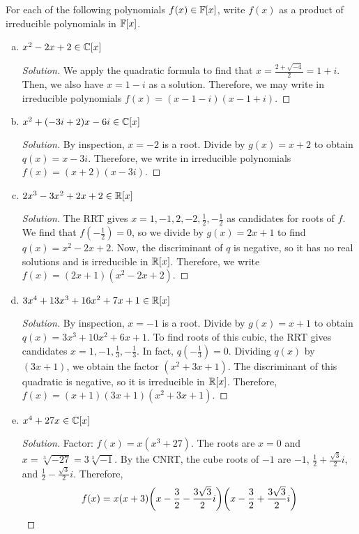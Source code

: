 \documentclass{agony}
\begin{document}
\question For each of the following polynomials $f(x) \in \mathbb{F}[x]$,
write $f(x)$ as a product of irreducible polynomials in $\mathbb{F}[x]$.
\begin{enumerate}[(a)]
  \item $x^2 - 2x + 2 \in \mathbb{C}[x]$
        \begin{proof}[Solution]
          We apply the quadratic formula to find that $x = \frac{2+\sqrt{-4}}{2} = 1+i$.
          Then, we also have $x = 1-i$ as a solution.
          Therefore, we may write in irreducible polynomials $f(x)=(x-1-i)(x-1+i)$.
        \end{proof}
  \item $x^2 + (-3i + 2)x - 6i \in \mathbb{C}[x]$
        \begin{proof}[Solution]
          By inspection, $x=-2$ is a root.
          Divide by $g(x)=x+2$ to obtain $q(x)=x-3i$.
          Therefore, we write in irreducible polynomials $f(x)=(x+2)(x-3i)$.
        \end{proof}
  \item $2x^3 - 3x^2 + 2x + 2 \in \mathbb{R}[x]$
        \begin{proof}[Solution]
          The RRT gives $x=1,-1,2,-2,\frac12,-\frac12$ as candidates for roots of $f$.
          We find that $f(-\frac12)=0$, so we divide by $g(x)=2x+1$ to find $q(x)=x^2-2x+2$.
          Now, the discriminant of $q$ is negative, so it has no real solutions and is irreducible in $\mathbb{R}[x]$.
          Therefore, we write $f(x)=(2x+1)(x^2-2x+2)$.
        \end{proof}
  \item $3x^4 + 13x^3 + 16x^2 + 7x + 1 \in \mathbb{R}[x]$
        \begin{proof}[Solution]
          By inspection, $x=-1$ is a root.
          Divide by $g(x)=x+1$ to obtain $q(x)=3x^3+10x^2+6x+1$.
          To find roots of this cubic, the RRT gives candidates $x=1,-1,\frac13,-\frac13$.
          In fact, $q(-\frac13)=0$.
          Dividing $q(x)$ by $(3x+1)$, we obtain the factor $(x^2+3x+1)$.
          The discriminant of this quadratic is negative, so it is irreducible in $\mathbb{R}[x]$.
          Therefore, $f(x) = (x+1)(3x+1)(x^2+3x+1)$.
        \end{proof}
  \item $x^4 + 27x \in \mathbb{C}[x]$
        \begin{proof}[Solution]
          Factor: $f(x) = x(x^3 + 27)$.
          The roots are $x=0$ and $x=\sqrt[3]{-27}=3\sqrt[3]{-1}$.
          By the CNRT, the cube roots of $-1$ are $-1$,
          $\frac12+\frac{\sqrt{3}}2i$, and $\frac12-\frac{\sqrt{3}}2i$. Therefore,
          \[ f(x) = x(x+3)\qty(x-\frac{3}{2}-\frac{3\sqrt{3}}{2}i)\qty(x-\frac{3}{2}+\frac{3\sqrt{3}}{2}i) \qedhere \]
        \end{proof}
\end{enumerate}
\end{document}
